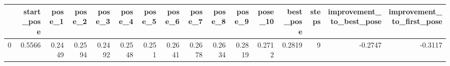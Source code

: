 \begin{tabular}{lrrrrrrrrrrrrrrr}
\toprule
{} &  start\_pose &  pose\_1 &  pose\_2 &  pose\_3 &  pose\_4 &  pose\_5 &  pose\_6 &  pose\_7 &  pose\_8 &  pose\_9 &  pose\_10 &  best\_pose &  steps &  improvement\_to\_best\_pose &  improvement\_to\_first\_pose \\
\midrule
0 &      0.5566 &  0.2449 &  0.2594 &  0.2492 &  0.2548 &   0.251 &  0.2641 &  0.2678 &  0.2634 &  0.2819 &   0.2712 &     0.2819 &      9 &                   -0.2747 &                    -0.3117 \\
\bottomrule
\end{tabular}
